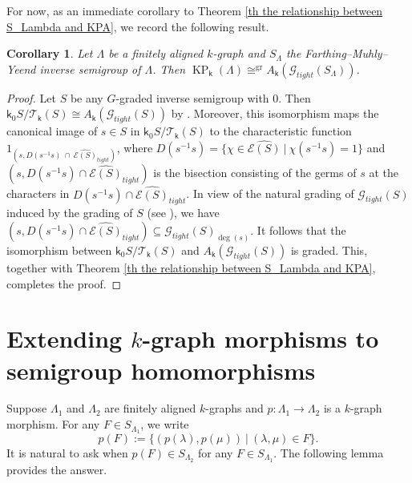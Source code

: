 \documentclass[a4paper,reqno,11pt]{amsart}
\numberwithin{equation}{section}
\newtheorem{cor}[thm]{Corollary}
\theoremstyle{definition}
\theoremstyle{remark}
\newcommand{\gr}{\operatorname{gr}}
\newcommand{\KP}{\operatorname{KP}}
\begin{document}
For now, as an immediate corollary to Theorem \ref{th the relationship between S_Lambda and KPA}, we record the following result.
\begin{cor}\label{cor relation of KP with SA of tight groupoid of FMY}
Let $\Lambda$ be a finitely aligned $k$-graph and $S_\Lambda$ the Farthing--Muhly--Yeend inverse semigroup of $\Lambda$. Then $\KP_\mathsf{k}(\Lambda)\cong^{\gr} A_\mathsf{k}(\mathcal{G}_{tight}(S_\Lambda))$.
\end{cor}
\begin{proof}
Let $S$ be any $G$-graded inverse semigroup with $0$. Then $\mathsf{k}_0S/{\mathcal{T}_\mathsf{k}(S)}\cong A_\mathsf{k}(\mathcal{G}_{tight}(S))$ by \cite[Corollary 2.14]{Steinberg}. Moreover, this isomorphism maps the canonical image of $s\in S$ in $\mathsf{k}_0S/{\mathcal{T}_\mathsf{k}(S)}$ to the characteristic function $1_{\left(s,D(s^{-1}s)~\cap~\widehat{\mathcal{E}(S)}_{tight}\right)}$, where $D(s^{-1}s)=\{\chi\in \widehat{\mathcal{E}(S)}~|~\chi(s^{-1}s)=1\}$ and $\left(s,D(s^{-1}s)\cap \widehat{\mathcal{E}(S)}_{tight}\right)$ is the bisection consisting of the germs of $s$ at the characters in $D(s^{-1}s)\cap \widehat{\mathcal{E}(S)}_{tight}$. In view of the natural grading of $\mathcal{G}_{tight}(S)$ induced by the grading of $S$ (see \cite[\S 6.2]{HazMes}), we have $\left(s,D(s^{-1}s)\cap \widehat{\mathcal{E}(S)}_{tight}\right)\subseteq \mathcal{G}_{tight}(S)_{\deg(s)}$. It follows that the isomorphism between $\mathsf{k}_0S/{\mathcal{T}_\mathsf{k}(S)}$ and $A_\mathsf{k}(\mathcal{G}_{tight}(S))$ is graded. This, together with Theorem \ref{th the relationship between S_Lambda and KPA}, completes the proof.
\end{proof}

\section{Extending \texorpdfstring{$k$}{k}-graph morphisms to semigroup homomorphisms}\label{sec extending morphisms}
Suppose $\Lambda_1$ and $\Lambda_2$ are finitely aligned $k$-graphs and $p:\Lambda_1\longrightarrow \Lambda_2$ is a $k$-graph morphism. For any $F\in S_{\Lambda_1}$, we write \[p(F):=\{(p(\lambda),p(\mu))~|~(\lambda,\mu)\in F\}.\] It is natural to ask when $p(F)\in S_{\Lambda_2}$ for any $F\in S_{\Lambda_1}$. The following lemma provides the answer.
\end{document}
